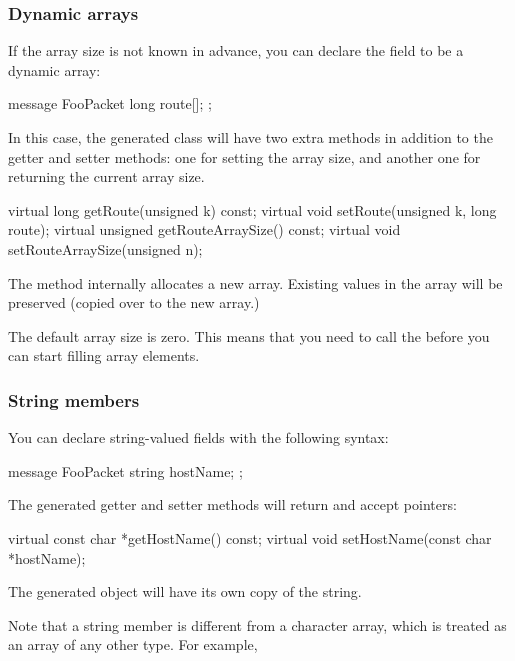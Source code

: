 \subsubsection{Dynamic arrays}

If the array size is not known in advance, you can declare the field
to be a dynamic array:

\begin{msg}
message FooPacket
{
    long route[];
};
\end{msg}

In this case, the generated class will have two extra methods in addition
to the getter and setter methods: one for setting the array size, and another
one for returning the current array size.

\begin{cpp}
virtual long getRoute(unsigned k) const;
virtual void setRoute(unsigned k, long route);
virtual unsigned getRouteArraySize() const;
virtual void setRouteArraySize(unsigned n);
\end{cpp}

The  method internally allocates a new array. Existing
values in the array will be preserved (copied over to the new array.)

The default array size is zero. This means that you need to call the
 before you can start filling array elements.


\subsubsection{String members}

You can declare string-valued fields with the following syntax:

\begin{msg}
message FooPacket
{
    string hostName;
};
\end{msg}

The generated getter and setter methods will return and accept 
pointers:

\begin{cpp}
virtual const char *getHostName() const;
virtual void setHostName(const char *hostName);
\end{cpp}

The generated object will have its own copy of the string.

Note that a string member is different from a character array,
which is treated as an array of any other type. For example,

